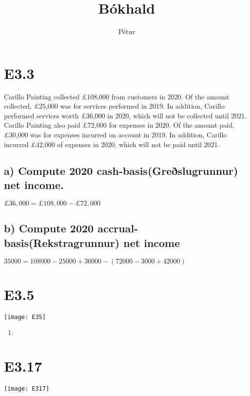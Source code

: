\documentclass[]{article}
\begin{document}
\title{Bókhald}
\author{Pétur}
\maketitle

\section*{E3.3}

Carillo Painting collected £108,000 from customers in 2020. Of the amount collected, £25,000 was for services performed in 2019. In addition, Carillo performed services worth £36,000 in 2020, which will not be collected until 2021.\\ 
Carillo Painting also paid £72,000 for expenses in 2020. Of the amount paid, £30,000 was for expenses incurred on account in 2019. In addition, Carillo incurred £42,000 of expenses in 2020, which will not be paid until 2021. 
\subsection*{a) Compute 2020 cash-basis(Greðslugrunnur) net income.}
$£36,000=£108,000-£72,000$
\subsection*{b) Compute 2020 accrual-basis(Rekstragrunnur) net income}
$35000=108000-25000+36000-(72000-3000+42000)$

\section*{E3.5}
\texttt{[image: E35]}

\begin{enumerate}
	\item
\end{enumerate}
\section*{E3.17}
\texttt{[image: E317]}
\end{document}

